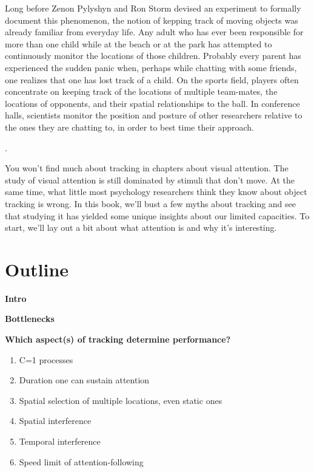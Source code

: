 \documentclass[
]{book}
\providecommand{\tightlist}{%
  \setlength{\itemsep}{0pt}\setlength{\parskip}{0pt}}
\begin{document}
Long before Zenon Pylyshyn and Ron Storm devised an experiment to formally document this phenomenon, the notion of kepping track of moving objects was already familiar from everyday life. Any adult who has ever been responsible for more than one child while at the beach or at the park has attempted to continuously monitor the locations of those children. Probably every parent has experienced the sudden panic when, perhaps while chatting with some friends, one realizes that one has lost track of a child. On the sports field, players often concentrate on keeping track of the locations of multiple team-mates, the locations of opponents, and their spatial relationships to the ball. In conference halls, scientists monitor the position and posture of other researchers relative to the ones they are chatting to, in order to best time their approach.

.

You won't find much about tracking in chapters about visual attention. The study of visual attention is still dominated by stimuli that don't move. At the same time, what little most psychology researchers think they know about object tracking is wrong. In this book, we'll bust a few myths about tracking and see that studying it has yielded some unique insights about our limited capacities. To start, we'll lay out a bit about what attention is and why it's interesting.

\hypertarget{outline}{%
\section{Outline}\label{outline}}

\textbf{Intro}

\textbf{Bottlenecks}

\textbf{Which aspect(s) of tracking determine performance?}

\begin{enumerate}
\def\labelenumi{\arabic{enumi}.}
\tightlist
\item
  C=1 processes
\item
  Duration one can sustain attention
\item
  Spatial selection of multiple locations, even static ones
\item
  Spatial interference
\item
  Temporal interference
\item
  Speed limit of attention-following
\end{enumerate}
\end{document}
